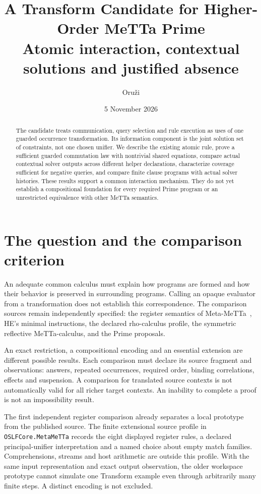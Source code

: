 \documentclass[11pt]{article}
\title{A Transform Candidate for Higher-Order MeTTa Prime\\
\large Atomic interaction, contextual solutions and justified absence}
\author{Oru\v{z}i}
\date{5 November 2026}
\newcommand{\code}[1]{\texttt{\small #1}}
\begin{document}
\maketitle

\begin{abstract}
The candidate treats communication, query selection and rule execution as
uses of one guarded occurrence transformation. Its information component is
the joint solution set of constraints, not one chosen unifier. We describe
the existing atomic rule, prove a sufficient guarded commutation law with
nontrivial shared equations, compare actual contextual solver outputs across
different helper declarations, characterize coverage sufficient for
negative queries, and compare finite clause programs with actual solver
histories. These results support a common interaction mechanism.
They do not yet establish a compositional foundation for every required
Prime program or an unrestricted equivalence with other MeTTa semantics.
\end{abstract}

\section{The question and the comparison criterion}

An adequate common calculus must explain how programs are formed and how
their behavior is preserved in surrounding programs. Calling an opaque
evaluator from a transformation does not establish this correspondence.
The comparison sources remain independently specified: the register
semantics of Meta-MeTTa~\cite{metametta}, HE's minimal instructions, the
declared rho-calculus profile, the symmetric reflective MeTTa-calculus,
and the Prime proposals.

An exact restriction, a compositional encoding and an essential extension
are different possible results. Each comparison must declare its source
fragment and observations: answers, repeated occurrences, required order,
binding correlations, effects and suspension. A comparison for translated
source contexts is not automatically valid for all richer target contexts.
An inability to complete a proof is not an impossibility result.

The first independent register comparison already separates a local
prototype from the published source. The finite extensional source profile
in \code{OSLFCore.MetaMeTTa} records the eight displayed register rules,
a declared principal-unifier interpretation and a named choice about empty match families.
Comprehensions, streams and host arithmetic are outside this profile.
With the same input representation and exact output observation, the older
workspace prototype cannot simulate one Transform example even through
arbitrarily many finite steps. A distinct encoding is not excluded.
\end{document}
